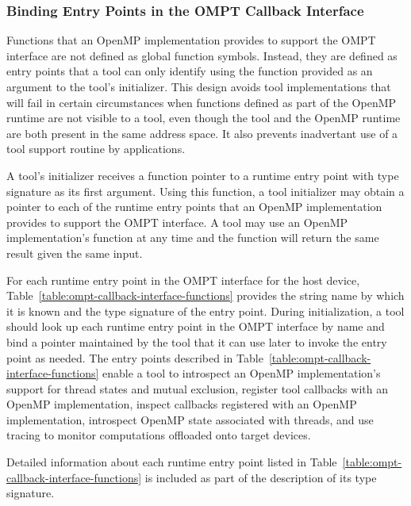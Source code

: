 \subsubsection{Binding Entry Points in the OMPT Callback Interface}
\label{sec:ompt-bind}

Functions that an OpenMP implementation provides to support the OMPT interface
are not defined as global function symbols. Instead, they are defined as entry points 
that a tool can only identify using the  function provided as an
argument to the tool's initializer. This design avoids tool
implementations that
will fail in certain circumstances when functions defined as part of
the OpenMP runtime are not visible to a tool, even though the tool and
the OpenMP runtime are both present in the same address space.
It also prevents inadvertant use of a tool support routine by
applications.
 
A tool's initializer receives a function pointer to a 
runtime entry point with type signature
 as its first argument. Using this
function, a tool initializer may obtain a pointer to each of the
runtime entry points that an OpenMP implementation provides to support
the OMPT interface. A tool may use an OpenMP implementation's
 function at any time and the function will return the
same result given the same input.

For each runtime entry point in the OMPT interface for the host device, 
Table~\ref{table:ompt-callback-interface-functions} provides the string
name by which it is known and the type signature of the entry point. 
During initialization, a tool should look up each runtime entry point in the
OMPT interface by name and bind a pointer maintained by the tool
that it can use later to invoke the entry point as needed. The entry points
described in Table~\ref{table:ompt-callback-interface-functions}
enable a tool to introspect an OpenMP
implementation's support for thread states and mutual exclusion,
register tool callbacks with an OpenMP implementation, inspect 
callbacks registered with an OpenMP implementation, 
introspect OpenMP state associated with threads, and use tracing to monitor
computations offloaded onto target devices.

Detailed information about each runtime entry point listed in 
Table~\ref{table:ompt-callback-interface-functions} is included as
part of the description of its type signature.

